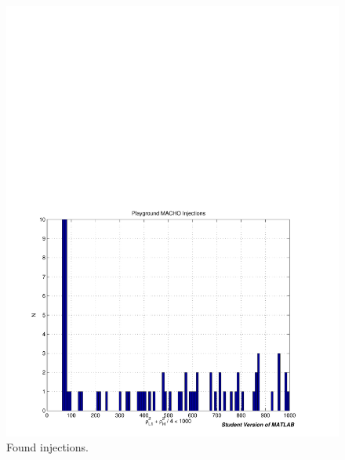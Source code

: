 \begin{figure}[p]
\begin{center}
\includegraphics[width=\textwidth]{analysis/figures/inj_hist_lo}
\end{center}
\caption{\label{f:pipeline}%
Found injections.
}
\end{figure}


